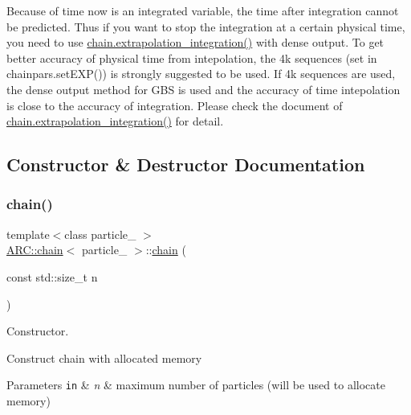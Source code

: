 Because of time now is an integrated variable, the time after integration cannot be predicted. Thus if you want to stop the integration at a certain physical time, you need to use \hyperlink{classARC_1_1chain_acd19e23d46d38d66c5eb60a2e9afe727}{chain.\+extrapolation\+\_\+integration()} with dense output. To get better accuracy of physical time from intepolation, the 4k sequences (set in chainpars.\+set\+E\+X\+P()) is strongly suggested to be used. If 4k sequences are used, the dense output method for G\+BS is used and the accuracy of time intepolation is close to the accuracy of integration. Please check the document of \hyperlink{classARC_1_1chain_acd19e23d46d38d66c5eb60a2e9afe727}{chain.\+extrapolation\+\_\+integration()} for detail. 

\subsection{Constructor \& Destructor Documentation}
\hypertarget{classARC_1_1chain_a8a3daa4bad15c5faeaebece934a0ae4a}{}\label{classARC_1_1chain_a8a3daa4bad15c5faeaebece934a0ae4a} 
\subsubsection{\texorpdfstring{chain()}{chain()}\hspace{0.1cm}{\footnotesize\ttfamily [1/2]}}
{\footnotesize\ttfamily template$<$class particle\+\_\+ $>$ \\
\hyperlink{classARC_1_1chain}{A\+R\+C\+::chain}$<$ particle\+\_\+ $>$\+::\hyperlink{classARC_1_1chain}{chain} (\begin{DoxyParamCaption}\item[{const std\+::size\+\_\+t}]{n }\end{DoxyParamCaption})\hspace{0.3cm}{\ttfamily [inline]}}



Constructor. 

Construct chain with allocated memory 
\begin{DoxyParams}[1]{Parameters}
\mbox{\tt in}  & {\em n} & maximum number of particles (will be used to allocate memory) \\
\hline
\end{DoxyParams}
\hypertarget{classARC_1_1chain_a8590b2bc343867d9ef246946f3002063}{}\label{classARC_1_1chain_a8590b2bc343867d9ef246946f3002063} 
